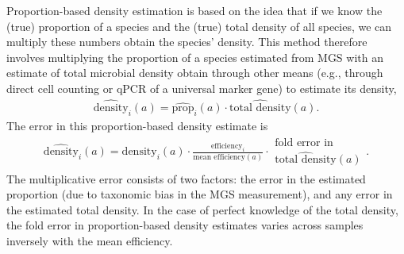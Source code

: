 \documentclass[
]{article}
\theoremstyle{definition}
\theoremstyle{definition}
\theoremstyle{definition}
\theoremstyle{definition}
\theoremstyle{remark}
\begin{document}
Proportion-based density estimation is based on the idea that if we know the (true) proportion of a species and the (true) total density of all species, we can multiply these numbers obtain the species' density.
This method therefore involves multiplying the proportion of a species estimated from MGS with an estimate of total microbial density obtain through other means (e.g., through direct cell counting or qPCR of a universal marker gene) to estimate
its density,
\begin{align}
  \label{eq:density-prop-est}
  \hat{\text{density}}_{i}(a) 
  = \hat{\text{prop}}_{i}(a) \cdot \hat{\text{total density}}(a).
\end{align}
The error in this proportion-based density estimate is
\begin{align}
  \label{eq:density-prop-error}
  \hat{\text{density}}_{i}(a) 
  = \text{density}_{i}(a) \cdot \frac{\text{efficiency}_{i}}{\text{mean efficiency}(a)} 
  \cdot \substack{\text{fold error in} \\ \hat{\text{total density}}(a)}.
\end{align}
The multiplicative error consists of two factors: the error in the estimated proportion (due to taxonomic bias in the MGS measurement), and any error in the estimated total density.
In the case of perfect knowledge of the total density, the fold error in proportion-based density estimates varies across samples inversely with the mean efficiency.
\end{document}
